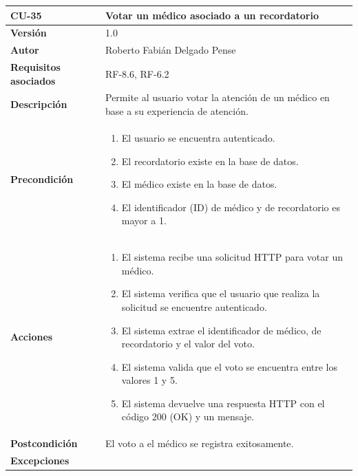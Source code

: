 \begin{table}[p]
	\centering
	\begin{tabularx}{\linewidth}{ p{} p{} }
		\toprule
		\textbf{CU-35}    & \textbf{Votar un médico asociado a un recordatorio}\\
		\toprule
		\textbf{Versión}              & 1.0    \\
		\textbf{Autor}                & Roberto Fabián Delgado Pense \\
		\textbf{Requisitos asociados} & RF-8.6, RF-6.2 \\ 
		\textbf{Descripción}          & Permite al usuario votar la atención de un médico en base a su experiencia de atención. \\
		\textbf{Precondición}         & 
  		\begin{enumerate}
			\def\labelenumi{\arabic{enumi}.}
			\tightlist
			\item El usuario se encuentra autenticado.
                \item El recordatorio existe en la base de datos.
                \item El médico existe en la base de datos.
                \item El identificador (ID) de médico y de recordatorio es mayor a 1.
            \end{enumerate}\\
		\textbf{Acciones}             &
		\begin{enumerate}
			\def\labelenumi{\arabic{enumi}.}
			\tightlist
			\item El sistema recibe una solicitud HTTP para votar un médico.
                \item El sistema verifica que el usuario que realiza la solicitud se encuentre autenticado.
			\item El sistema extrae el identificador de médico, de recordatorio y el valor del voto.
         	\item El sistema valida que el voto se encuentra entre los valores 1 y 5.
                \item El sistema devuelve una respuesta HTTP con el código 200 (OK) y un mensaje.
            \end{enumerate}\\
		\textbf{Postcondición}        & El voto a el médico se registra exitosamente.\\
		\textbf{Excepciones}          & 
            \begin{enumerate}

\end{enumerate}
\end{tabularx}
\end{table}
